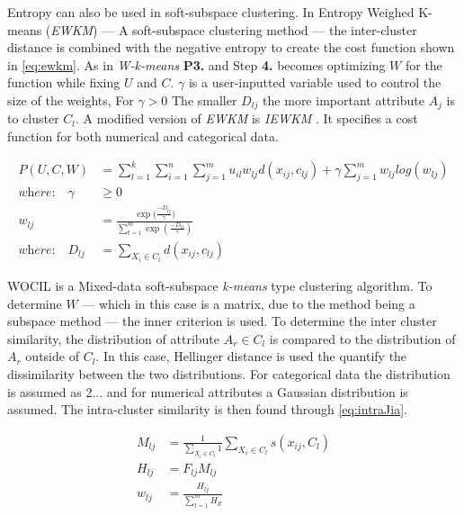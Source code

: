 \documentclass[../report.tex]{subfiles}
\begin{document}
Entropy can also be used in soft-subspace clustering. In Entropy Weighed K-means (\textit{EWKM}) \cite{Jing2007} --- A soft-subspace clustering method --- the inter-cluster distance is combined with the negative entropy to create the cost function shown in \ref{eq:ewkm}. As in \textit{W-k-means} \textbf{P3.} and Step \textbf{4.} becomes optimizing $W$ for the function while fixing $U$ and $C$. $\gamma$ is a user-inputted variable used to control the size of the weights, For $\gamma > 0$ The smaller $D_{ lj }$ the more important attribute $A_j$ is to cluster $C_l$. A modified version of \textit{EWKM} is \textit{IEWKM} \cite{Li2008}. It specifies a cost function for both numerical and categorical data.

\begin{align}
  P(U,C,W) &= \sum^k_{l=1} \sum^n_{i=1} \sum^m_{j=1} u_{il} w_{ lj } d(x_{ij},c_{lj}) + \gamma \sum_{j=1}^{m}{ w_{lj} log (w_{lj}) } \\
\textit{where:}\quad\gamma&\geq 0 \\
\label{eq:ewkm}
	w_{lj} &= \frac{\exp({\frac{-D_{lj}}{\gamma})}}{\sum_{t=1}^{m}{\exp{(\frac{-D_{lt}}{\gamma})}}} \\
\textit{where:}\quad D_{ lj } &= \sum_{X_i \in C_l}{d(x_{ij},c_{ lj })}
\end{align}

WOCIL \cite{Jia2018} is a Mixed-data soft-subspace \textit{k-means} type clustering algorithm.
To determine $W$ --- which in this case is a matrix, due to the method being a subspace method --- the inner criterion is used. To determine the inter cluster similarity, the distribution of attribute $A_r \in C_l$ is compared to the distribution of $A_r$ outside of $C_l$. In this case, Hellinger distance is used the quantify the dissimilarity between the two distributions. For categorical data the distribution is assumed as 2... and for numerical attributes a Gaussian distribution is assumed. The intra-cluster similarity is then found through \ref{eq:intraJia}.

\begin{align}
  M_{lj} &= \frac{1}{\sum_{X_i \in C_{l}}{1}} \sum_{X_i \in C_{l}}{s(x_{ ij }, C_l)} \\
\label{eq:intraJia}
 H_{ lj } &= F_{ lj} M_{ lj } \\
  w_{lj} & = \frac{H_{lj}}{\sum_{t = 1}^{m}{H_{lt}}}
\label{eq:Jiaweight}
\end{align}
\end{document}
